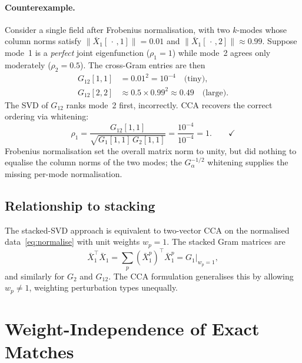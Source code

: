 \documentclass[a4paper,11pt]{article}
\newcommand{\Xn}[2]{\bar{X}_{#1}^{#2}}
\newcommand{\Gb}[1]{G_{#1}}
\theoremstyle{plain}
\begin{document}
\paragraph{Counterexample.}
Consider a single field after Frobenius normalisation, with two $k$-modes whose
column norms satisfy $\|\Xn{1}{}[\,\cdot\,,1]\|=0.01$ and
$\|\Xn{1}{}[\,\cdot\,,2]\|\approx 0.99$.
Suppose mode~1 is a \emph{perfect} joint eigenfunction ($\rho_1=1$) while mode~2
agrees only moderately ($\rho_2=0.5$).
The cross-Gram entries are then
\begin{align}
    \Gb{12}[1,1] &= 0.01^2 = 10^{-4} \quad\text{(tiny)},\\
    \Gb{12}[2,2] &\approx 0.5\times 0.99^2 \approx 0.49 \quad\text{(large)}.
\end{align}
The SVD of $\Gb{12}$ ranks mode~2 first, incorrectly.
CCA recovers the correct ordering via whitening:
\begin{equation}
    \rho_1 = \frac{\Gb{12}[1,1]}{\sqrt{\Gb{1}[1,1]\,\Gb{2}[1,1]}}
           = \frac{10^{-4}}{10^{-4}} = 1. \qquad \checkmark
\end{equation}
Frobenius normalisation set the overall matrix norm to unity, but did nothing to equalise
the column norms of the two modes; the $\Gb{\alpha}^{-1/2}$ whitening supplies the missing
per-mode normalisation.

\subsection{Relationship to stacking}
\label{sec:equivalence}

The stacked-SVD approach is equivalent to two-vector CCA on the normalised data~\eqref{eq:normalise} with unit weights $w_p = 1$.
The stacked Gram matrices are
\begin{equation}
    \bar{X}_1^\top \bar{X}_1 = \sum_p (\Xn{1}{p})^\top \Xn{1}{p} = \Gb{1}\big|_{w_p = 1},
\end{equation}
and similarly for $\Gb{2}$ and $\Gb{12}$.
The CCA formulation generalises this by allowing $w_p \neq 1$, weighting perturbation types unequally.

\section{Weight-Independence of Exact Matches}
\label{sec:weight-independence}
\end{document}
